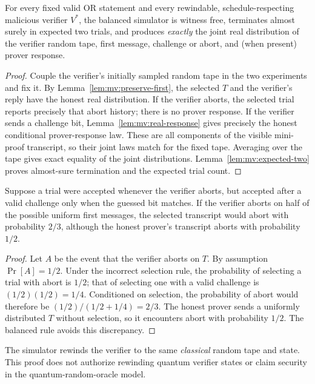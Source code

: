 \begin{theorem}\label{thm:mv:one-perfect}
For every fixed valid OR statement and every
rewindable, schedule-respecting malicious
verifier $V^*$, the balanced simulator is
witness free, terminates almost surely in
expected two trials, and produces \emph{exactly}
the joint real distribution of the verifier
random tape, first message, challenge or abort,
and (when present) prover response.
\end{theorem}
\begin{proof}
Couple the verifier's initially sampled
random tape in the two experiments and fix
it. By Lemma~\ref{lem:mv:preserve-first},
the selected $T$ and the verifier's
reply have the honest real distribution.
If the verifier aborts, the selected
trial reports precisely that abort history;
there is no prover response.
If the verifier sends a challenge bit,
Lemma~\ref{lem:mv:real-response}
gives precisely the honest conditional
prover-response law.
These are all components of the visible
mini-proof transcript, so their joint
laws match for the fixed tape.
Averaging over the tape gives exact
equality of the joint distributions.
Lemma~\ref{lem:mv:expected-two}
proves almost-sure termination and
the expected trial count.
\end{proof}

\begin{lemma}\label{lem:mv:abort-bias}
Suppose a trial were accepted whenever the verifier
aborts, but accepted after a valid challenge
only when the guessed bit matches.
If the verifier aborts on half of the possible
uniform first messages, the selected transcript
would abort with probability $2/3$, although
the honest prover's transcript aborts with
probability $1/2$.
\end{lemma}
\begin{proof}
Let $A$ be the event that the verifier
aborts on $T$. By assumption $\Pr[A]=1/2$.
Under the incorrect selection rule,
the probability of selecting a trial
with abort is $1/2$; that of selecting
one with a valid challenge is
$(1/2)(1/2)=1/4$.
Conditioned on selection, the probability
of abort would therefore be
$(1/2)/(1/2+1/4)=2/3$.
The honest prover sends a uniformly
distributed $T$ without selection,
so it encounters abort with probability
$1/2$. The balanced rule avoids
this discrepancy.
\end{proof}

\begin{remark}
The simulator rewinds the verifier to
the same \emph{classical} random tape and state.
This proof does not authorize rewinding
quantum verifier states or claim security
in the quantum-random-oracle model.
\end{remark}
